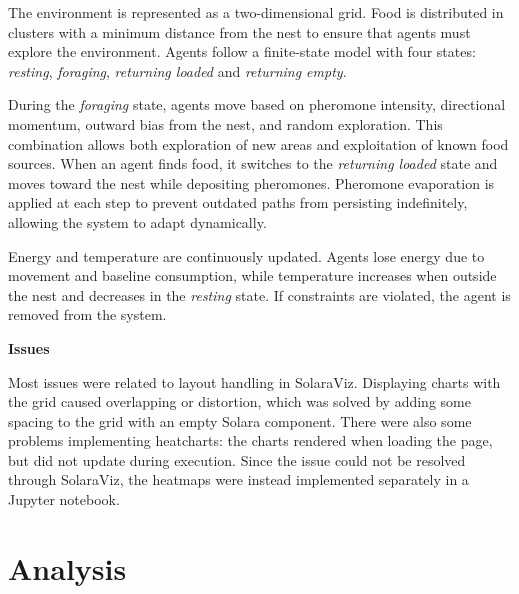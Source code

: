 \documentclass[11pt]{article}
\begin{document}
The environment is represented as a two-dimensional grid. %
Food is distributed in clusters with a minimum distance from the nest to ensure that agents must explore the environment. %
Agents follow a finite-state model with four states: \textit{resting}, \textit{foraging}, \textit{returning loaded} and \textit{returning empty}. 

During the \textit{foraging} state, agents move based on %
pheromone intensity, directional momentum, outward bias from the nest, and random exploration. This combination allows both exploration of new areas and exploitation of known food sources.
When an agent finds food, it switches to the \textit{returning loaded} state and moves toward the nest while depositing pheromones. %
Pheromone evaporation is applied at each step to prevent outdated paths from persisting indefinitely, allowing the system to adapt dynamically.

Energy and temperature are continuously updated. Agents lose energy due to movement and baseline consumption, while temperature increases when outside the nest and decreases in the \textit{resting} state. If constraints are violated, the agent is removed from the system.

\textbf{Issues}


Most issues %
were related to layout handling in SolaraViz. Displaying charts with the grid caused overlapping or distortion, which was solved by adding some spacing to the grid with an empty Solara component. There were also some problems implementing heatcharts: the charts rendered when loading the page, but did not update during execution. Since the issue could not be resolved through SolaraViz, the heatmaps were instead implemented separately in a Jupyter notebook. %

\section{Analysis}
\end{document}
